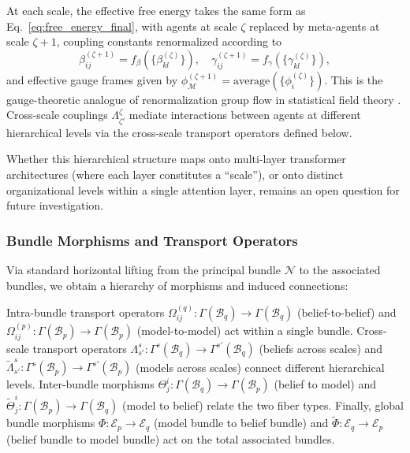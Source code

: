 \documentclass[twoside,11pt]{article}
\begin{document}
At each scale, the effective free energy takes the same form as Eq.~\eqref{eq:free_energy_final}, with agents at scale $\zeta$ replaced by meta-agents at scale $\zeta+1$, coupling constants renormalized according to
\begin{equation*}
  \beta_{ij}^{(\zeta+1)} = f_\beta(\{\beta_{kl}^{(\zeta)}\}), \quad
  \gamma_{ij}^{(\zeta+1)} = f_\gamma(\{\gamma_{kl}^{(\zeta)}\}),
\end{equation*}
and effective gauge frames given by $\phi_{\mathcal{M}}^{(\zeta+1)} = \text{average}(\{\phi_i^{(\zeta)}\})$.
This is the gauge-theoretic analogue of renormalization group flow in statistical field theory \citep{anderson1984basic,wilson1974renormalization,garciaMillan2024network}. Cross-scale couplings $\Lambda^{\zeta}_{\zeta'}$ mediate interactions between agents at different hierarchical levels via the cross-scale transport operators defined below.

Whether this hierarchical structure maps onto multi-layer transformer architectures (where each layer constitutes a ``scale''), or onto distinct organizational levels within a single attention layer, remains an open question for future investigation.

\subsubsection{Bundle Morphisms and Transport Operators}
Via standard horizontal lifting from the principal bundle $\mathcal{N}$ to the associated bundles, we obtain a hierarchy of morphisms and induced connections:

Intra-bundle transport operators $\Omega^{(q)}_{ij}: \Gamma(\mathcal{B}_q) \to \Gamma(\mathcal{B}_q)$ (belief-to-belief) and $\Omega^{(p)}_{ij}: \Gamma(\mathcal{B}_p) \to \Gamma(\mathcal{B}_p)$ (model-to-model) act within a single bundle. Cross-scale transport operators $\Lambda^{s}_{s'}: \Gamma^{s}(\mathcal{B}_q) \to \Gamma^{s'}(\mathcal{B}_q)$ (beliefs across scales) and $\tilde{\Lambda}^{s}_{s'}: \Gamma^{s}(\mathcal{B}_p) \to \Gamma^{s'}(\mathcal{B}_p)$ (models across scales) connect different hierarchical levels. Inter-bundle morphisms $\Theta^i_j: \Gamma(\mathcal{B}_q) \to \Gamma(\mathcal{B}_p)$ (belief to model) and $\tilde{\Theta}^i_j: \Gamma(\mathcal{B}_p) \to \Gamma(\mathcal{B}_q)$ (model to belief) relate the two fiber types. Finally, global bundle morphisms $\Phi: \mathcal{E}_p \to \mathcal{E}_q$ (model bundle to belief bundle) and $\tilde{\Phi}: \mathcal{E}_q \to \mathcal{E}_p$ (belief bundle to model bundle) act on the total associated bundles.
\end{document}
